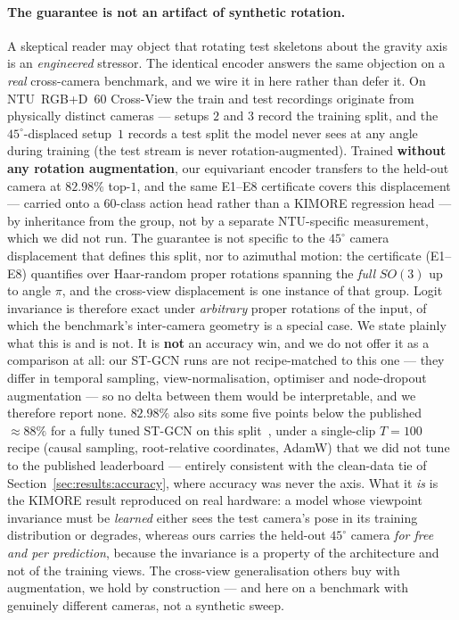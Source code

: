 \documentclass[10pt,journal]{IEEEtran}
\begin{document}
\paragraph{The guarantee is not an artifact of synthetic rotation.} A skeptical reader may object
that rotating test skeletons about the gravity axis is an \emph{engineered} stressor. The
identical encoder answers the same objection on a \emph{real} cross-camera benchmark, and we wire it
in here rather than defer it. On NTU~RGB+D~$60$ Cross-View the train and test recordings originate
from physically distinct cameras --- setups $2$ and $3$ record the training split, and the
$45^\circ$-displaced setup~$1$ records a test split the model never sees at any angle during
training (the test stream is never rotation-augmented). Trained \textbf{without any rotation
augmentation}, our equivariant encoder transfers to the held-out camera at $82.98\%$ top-$1$, and the
same E1--E8 certificate covers this displacement --- carried onto a $60$-class action head rather than
a KIMORE regression head --- by inheritance from the group, not by a separate NTU-specific
measurement, which we did not run. The guarantee is not specific to
the $45^\circ$ camera displacement that defines this split, nor to azimuthal motion: the certificate
(E1--E8) quantifies over Haar-random proper rotations spanning the \emph{full} $SO(3)$ up to angle
$\pi$, and the cross-view displacement is one instance of that group. Logit invariance is therefore
exact under \emph{arbitrary} proper rotations of the input, of which the benchmark's inter-camera
geometry is a special case. We state plainly what this is and
is not. It is \textbf{not} an accuracy win, and we do not offer it as a comparison at all: our ST-GCN
runs are not recipe-matched to this one --- they differ in temporal sampling, view-normalisation,
optimiser and node-dropout augmentation --- so no delta between them would be interpretable, and we
therefore report none. $82.98\%$ also sits some five points below the published $\approx\!88\%$ for a
fully tuned ST-GCN on this split~\cite{yan2018stgcn}, under a single-clip $T{=}100$ recipe (causal
sampling, root-relative coordinates, AdamW) that we did not tune to the published leaderboard ---
entirely consistent with the clean-data tie of Section~\ref{sec:results:accuracy}, where accuracy was
never the axis. What it \emph{is} is the KIMORE result reproduced on real hardware: a model whose viewpoint
invariance must be \emph{learned} either sees the test camera's pose in its training distribution or
degrades, whereas ours carries the held-out $45^\circ$ camera \emph{for free and per prediction},
because the invariance is a property of the architecture and not of the training views. The
cross-view generalisation others buy with augmentation, we hold by construction --- and here on a
benchmark with genuinely different cameras, not a synthetic sweep.
\end{document}
